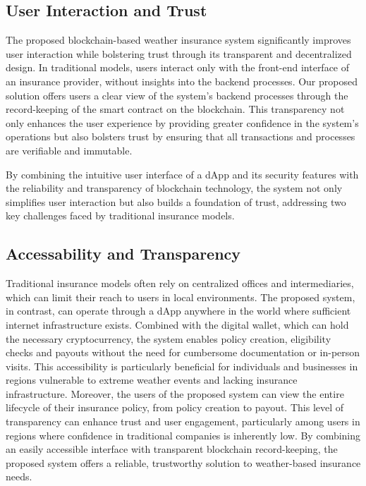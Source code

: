 \subsection{User Interaction and Trust}\label{user_interaction_and_trust}
The proposed blockchain-based weather insurance system significantly improves user interaction while bolstering trust through its transparent and decentralized design. In traditional models, users interact only with the front-end interface of an insurance provider, without insights into the backend processes. Our proposed solution offers users a clear view of the system's backend processes through the record-keeping of the smart contract on the blockchain. This transparency not only enhances the user experience by providing greater confidence in the system's operations but also bolsters trust by ensuring that all transactions and processes are verifiable and immutable.

By combining the intuitive user interface of a dApp and its security features with the reliability and transparency of blockchain technology, the system not only simplifies user interaction but also builds a foundation of trust, addressing two key challenges faced by traditional insurance models.

\subsection{Accessability and Transparency}\label{accessibility_transparency}
Traditional insurance models often rely on centralized offices and intermediaries, which can limit their reach to users in local environments. The proposed system, in contrast, can operate through a dApp anywhere in the world where sufficient internet infrastructure exists. Combined with the digital wallet, which can hold the necessary cryptocurrency, the system enables policy creation, eligibility checks and payouts without the need for cumbersome documentation or in-person visits. This accessibility is particularly beneficial for individuals and businesses in regions vulnerable to extreme weather events and lacking insurance infrastructure. Moreover, the users of the proposed system can view the entire lifecycle of their insurance policy, from policy creation to payout. This level of transparency can enhance trust and user engagement, particularly among users in regions where confidence in traditional companies is inherently low. By combining an easily accessible interface with transparent blockchain record-keeping, the proposed system offers a reliable, trustworthy solution to weather-based insurance needs.

